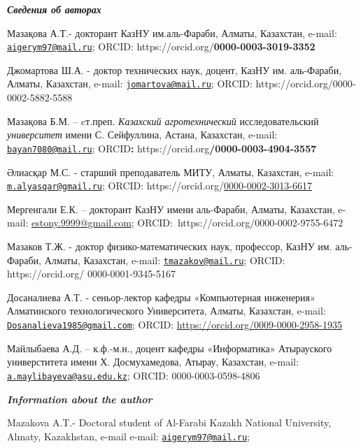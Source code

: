 \begin{authorinfo}
\emph{{\bfseries Сведения об авторах}}

Мазақова А.Т.- докторант КазНУ им.аль-Фараби, Алматы, Казахстан, e-mail:
\href{mailto:aigerym97@mail.ru}{\nolinkurl{aigerym97@mail.ru}}; ORCID:
https://orcid.org/{\bfseries 0000-0003-3019-3352}

Джомартова Ш.А. - доктор технических наук, доцент, КазНУ им. аль-Фараби,
Алматы, Казахстан, e-mail:
\href{mailto:jomartova@mail.ru}{\nolinkurl{jomartova@mail.ru}}; ORCID:
https://orcid.org/0000-0002-5882-5588

Мазақова Б.М. -- cт.преп. \emph{Казахский агротехнический}
исследовательский \emph{университет} имени С. Сейфуллина, Астана,
Казахстан, e-mail:
\href{mailto:bayan7080@mail.ru}{\nolinkurl{bayan7080@mail.ru}};
ORCID{\bfseries :} https://orcid.org{\bfseries /0000-0003-4904-3557}

Әлиасқар М.С. - старший преподаватель МИТУ, Алматы, Казахстан, e-mail:
\href{mailto:m.alyasqar@gmail.ru}{\nolinkurl{m.alyasqar@gmail.ru}};
ORCID:
https://orcid.org/\href{https://orcid.org/0000-0002-3013-6617}{0000-0002-3013-6617}

Мергенгали Е.К. -- докторант КазНУ имени аль-Фараби, Алматы, Казахстан,
e-mail:
\href{https://e.mail.ru/compose/?mailto=mailto\%3aestony.9999@gmail.com}{estony.9999@gmail.com};
ORCID:~https://orcid.org/0000-0002-9755-6472

Мазаков Т.Ж. - доктор физико-математических наук, профессор, КазНУ им.
аль-Фараби, Алматы, Казахстан, e-mail:
\href{mailto:tmazakov@mail.ru}{\nolinkurl{tmazakov@mail.ru}}; ORCID:
https://orcid.org/ 0000-0001-9345-5167

Досаналиева А.Т. - сеньор-лектор кафедры «Компьютерная инженерия»
Алматинского технологического Университета, Алматы, Казахстан, e-mail:
\href{mailto:Dosanalieva1985@gmail.com}{\nolinkurl{Dosanalieva1985@gmail.com}};
ORCID: \url{https://orcid.org/0009-0000-2958-1935}

Майлыбаева А.Д. -- к.ф.-м.н., доцент кафедры «Информатика» Атырауского
универститета имени Х. Досмухамедова, Атырау, Казахстан, e-mail:
\href{mailto:a.maylibayeva@asu.edu.kz}{\nolinkurl{a.maylibayeva@asu.edu.kz}};
ORCID: 0000-0003-0598-4806

\emph{{\bfseries Information about the author}}

Mazakova A.T.- Doctoral student of Al-Farabi Kazakh National University,
Almaty, Kazakhstan, e-mail e-mail:
\href{mailto:aigerym97@mail.ru}{\nolinkurl{aigerym97@mail.ru}};


\end{authorinfo}
